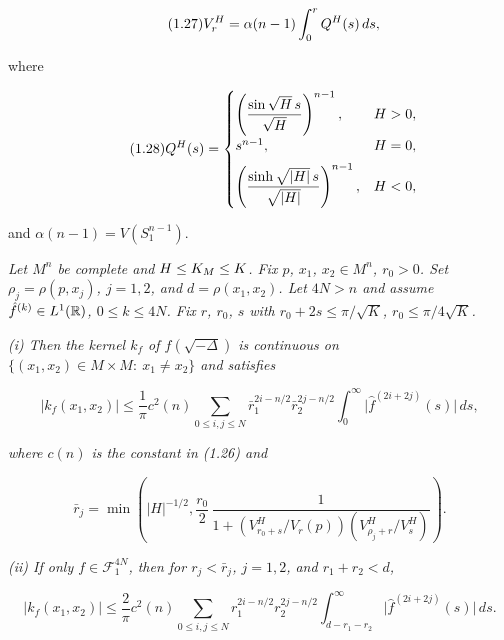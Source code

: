 \begin{equation}\tag{1.27}
V_r^{H} = \alpha(n-1)\int_0^r Q^{H}(s)\,ds,
\end{equation}

where

\begin{equation}\tag{1.28}
Q^{H}(s)=
\begin{cases}
\left(\dfrac{\sin \sqrt{H}\,s}{\sqrt{H}}\right)^{n-1}, & H>0,\\[1.2ex]
s^{n-1}, & H=0,\\[1.2ex]
\left(\dfrac{\sinh \sqrt{|H|}\,s}{\sqrt{|H|}}\right)^{n-1}, & H<0,
\end{cases}
\end{equation}

and $\alpha(n-1)=V(S^{n-1}_1)$.

\begin{theorem}
\label{thm:kernel-estimates-bounded-curvature}
\textit{Let $M^n$ be complete and $H \leq K_M \leq K$. Fix $p$, $x_1$, $x_2 \in M^n$,
$r_0 > 0$. Set $\rho_j = \rho(p,x_j)$, $j=1,2$, and $d = \rho(x_1,x_2)$.
Let $4N > n$ and assume $\hat f^{(k)} \in L^1(\mathbb{R})$, $0 \le k \le 4N$.
Fix $r$, $r_0$, $s$ with $r_0 + 2s \leq \pi/\sqrt{K}$, $r_0 \leq \pi/4\sqrt{K}$.}

\textit{(i) Then the kernel $k_f$ of $f(\sqrt{-\Delta})$ is continuous on
$\{(x_1,x_2) \in M \times M:\ x_1 \ne x_2\}$ and satisfies}

\begin{equation}\tag{1.29}
|k_f(x_1,x_2)| \leq \frac{1}{\pi} c^2(n) \sum_{0 \le i,j \le N}
\bar r_1^{2i-n/2}\bar r_2^{2j-n/2} \int_0^\infty \bigl|\hat f^{(2i+2j)}(s)\bigr|\,ds,
\end{equation}

\textit{where $c(n)$ is the constant in (1.26) and}

\begin{equation}\tag{1.30}
\bar r_j = \min\!\left(|H|^{-1/2}, \frac{r_0}{2}\,\frac{1}{1 + \left(V^{H}_{r_0+s}/V_r(p)\right)\left(V^{H}_{\rho_j+r}/V^{H}_s\right)}\right).
\end{equation}

\textit{(ii) If only $f \in \mathcal{F}^{4N}_1$, then for $r_j < \bar r_j$, $j=1,2$,
and $r_1 + r_2 < d$,}

\begin{equation}\tag{1.31}
|k_f(x_1,x_2)| \leq \frac{2}{\pi} c^2(n) \sum_{0 \le i,j \le N}
r_1^{2i-n/2}r_2^{2j-n/2} \int_{d-r_1-r_2}^\infty \bigl|\hat f^{(2i+2j)}(s)\bigr|\,ds.
\end{equation}
\end{theorem}

